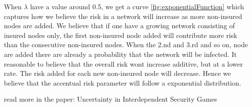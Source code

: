 When $\lambda$ have a value around 0.5, we get a curve \ref{fig:exponentialFunction} which captures how we believe the risk in a network will increase as more non-insured nodes are added. We believe that if one have a growing network consisting of insured nodes only, the first non-insured node added will contribute more risk than the consecutive non-insured nodes. When the 2.nd and 3.rd and so on, node are added there are already a probability that the network will be infected. It reasonable to believe that the overall risk wont increase additive, but at a lower rate. The risk added for each new non-insured node will decrease. Hence we believe that the accentual risk parameter will follow a exponential distribution. 

read more in the paper: Uncertainty in Interdependent Security Games